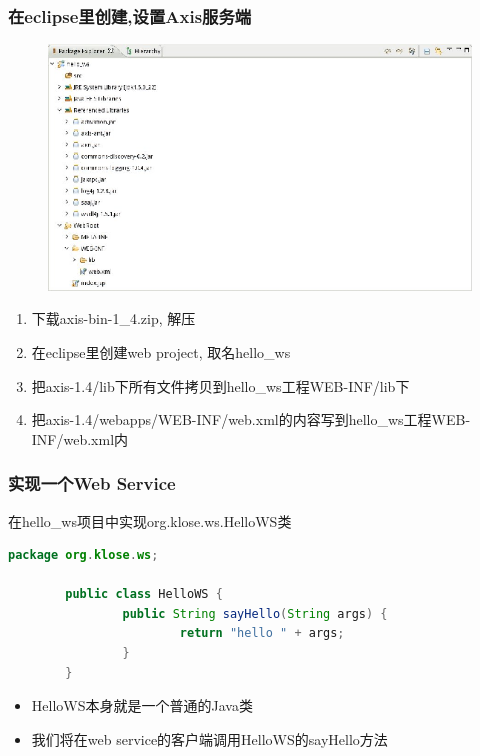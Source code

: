 \documentclass[CJKutf8,compress,hyperref]{beamer}
\begin{document}
\begin{CJK}{UTF8}{song}
        \begin{frame}
                \frametitle{在eclipse里创建,设置Axis服务端}
                \begin{figure}[!hbp]
                        \includegraphics{hello_ws.eps}
                \end{figure}
                \begin{enumerate}
                        \item 下载axis-bin-1\_4.zip, 解压
                        \item 在eclipse里创建web project, 取名hello\_ws
                        \item 把axis-1.4/lib下所有文件拷贝到hello\_ws工程WEB-INF/lib下
                        \item 把axis-1.4/webapps/WEB-INF/web.xml的内容写到hello\_ws工程WEB-INF/web.xml内
                \end{enumerate}
        \end{frame}


        \begin{frame}[containsverbatim]
        \frametitle{实现一个Web Service}
        在hello\_ws项目中实现org.klose.ws.HelloWS类
        \begin{lstlisting}[language=JAVA]
        package org.klose.ws;

        public class HelloWS {
                public String sayHello(String args) {
                        return "hello " + args;
                }
        }
        \end{lstlisting}
        \begin{itemize}
                \item HelloWS本身就是一个普通的Java类
                \item 我们将在web service的客户端调用HelloWS的sayHello方法
        \end{itemize}
\end{frame}


\end{CJK}
\end{document}
